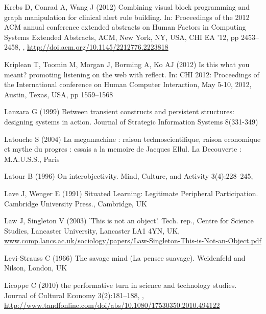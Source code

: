 \documentclass{article}
\begin{document}
\begin{thebibliography}{193}
Krebs D, Conrad A, Wang J (2012) Combining visual block programming and graph
  manipulation for clinical alert rule building. In: Proceedings of the 2012
  {ACM} annual conference extended abstracts on Human Factors in Computing
  Systems Extended Abstracts, {ACM}, New York, {NY}, {USA}, {CHI} {EA} '12, pp
  2453--2458, ,
  \urlprefix\url{http://doi.acm.org/10.1145/2212776.2223818}

Kriplean T, Toomin M, Morgan J, Borming A, Ko AJ (2012) Is this what you meant?
  promoting listening on the web with reflect. In: {CHI} 2012: Proceedings of
  the International conference on Human Computer Interaction, May 5-10, 2012,
  Austin, Texas, {USA}, pp 1559--1568

Lanzara G (1999) Between transient constructs and persistent structures:
  designing systems in action. Journal of Strategic Information Systems
  8(331-349)

Latouche S (2004) La megamachine : raison technoscientifique, raison economique
  et mythe du progres : essais a la memoire de Jacques Ellul. La Decouverte :
  {M.A.U.S.S.}, Paris

Latour B (1996) On interobjectivity. Mind, Culture, and Activity 3(4):228--245,

Lave J, Wenger E (1991) Situated Learning: Legitimate Peripheral Participation.
  Cambridge University Press., Cambridge, {UK}

Law J, Singleton V (2003) {'This} is not an object'. Tech. rep., Centre for
  Science Studies, Lancaster University, Lancaster {LA1} {4YN}, {UK},
  \urlprefix\url{www.comp.lancs.ac.uk/sociology/papers/Law-Singleton-This-is-Not-an-Object.pdf}

Levi-Strauss C (1966) The savage mind {(La} pensee suavage). Weidenfeld and
  Nilson, London, {UK}

Licoppe C (2010) the performative turn in science and technology studies.
  Journal of Cultural Economy 3(2):181--188,
  ,
  \urlprefix\url{http://www.tandfonline.com/doi/abs/10.1080/17530350.2010.494122}


\end{thebibliography}
\end{document}

